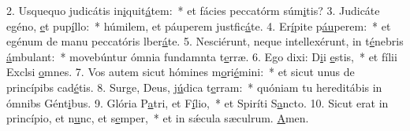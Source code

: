 2. Usquequo judicátis in\uline{i}quit\uline{á}tem:~* et fácies peccatórm súm\uline{i}tis?
3. Judicáte egéno, \uline{e}t pup\uline{í}llo:~* húmilem, et páuperem justfic\uline{á}te.
4. Er\uline{í}pite p\uline{áu}perem:~* et egénum de manu peccatóris lber\uline{á}te.
5. Nesciérunt, neque intellexérunt, in t\uline{é}nebris \uline{á}mbulant:~* movebúntur ómnia fundamnta t\uline{e}rræ.
6. Ego dixi: D\uline{i}i \uline{e}stis,~* et fílii Exclsi \uline{o}mnes.
7. Vos autem sicut hómines m\uline{o}ri\uline{é}mini:~* et sicut unus de princípibs cad\uline{é}tis.
8. Surge, Deus, j\uline{ú}dica t\uline{e}rram:~* quóniam tu hereditábis in ómnibs Gént\uline{i}bus.
9. Glória P\uline{a}tri, et F\uline{í}lio,~* et Spiríti S\uline{a}ncto.
10. Sicut erat in princípio, et n\uline{u}nc, et s\uline{e}mper,~* et in sǽcula sæculrum. \uline{A}men.

